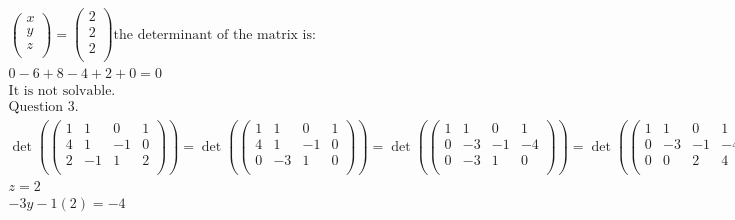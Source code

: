 \documentclass{article}
\begin{document}
\begin{align*}
    \begin{pmatrix}
        x \\
        y \\
        z \\
    \end{pmatrix}
    =
    \begin{pmatrix}
        2 \\
        2 \\
        2 \\
    \end{pmatrix}
    \textrm{the determinant of the matrix is:} \\
    0 - 6 + 8 - 4 + 2 + 0 = 0                  \\
    \textrm{It is not solvable.}               \\
    \textrm{Question 3.}                       \\
    \det(
    \begin{pmatrix}
            1 & 1  & 0  & 1 \\
            4 & 1  & -1 & 0 \\
            2 & -1 & 1  & 2 \\
        \end{pmatrix})
    =
    \det(
    \begin{pmatrix}
            1 & 1  & 0  & 1 \\
            4 & 1  & -1 & 0 \\
            0 & -3 & 1  & 0 \\
        \end{pmatrix})
    =
    \det(
    \begin{pmatrix}
            1 & 1  & 0  & 1  \\
            0 & -3 & -1 & -4 \\
            0 & -3 & 1  & 0  \\
        \end{pmatrix}
    )
    =
    \det(
    \begin{pmatrix}
            1 & 1  & 0  & 1  \\
            0 & -3 & -1 & -4 \\
            0 & 0  & 2  & 4  \\
        \end{pmatrix}
    )                                          \\
    z = 2                                      \\
    -3y -1(2) = -4                             \\

\end{align*}
\end{document}
